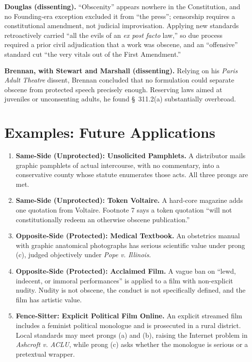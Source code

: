 \documentclass[12pt]{article}
\begin{document}
\textbf{Douglas (dissenting).} ``Obscenity'' appears nowhere in the Constitution, and no Founding-era exception excluded it from ``the press''; censorship requires a constitutional amendment, not judicial improvisation. Applying new standards retroactively carried ``all the evils of an \textit{ex post facto} law,'' so due process required a prior civil adjudication that a work was obscene, and an ``offensive'' standard cut ``the very vitals out of the First Amendment.''

\textbf{Brennan, with Stewart and Marshall (dissenting).} Relying on his \textit{Paris Adult Theatre} dissent, Brennan concluded that no formulation could separate obscene from protected speech precisely enough. Reserving laws aimed at juveniles or unconsenting adults, he found \S~311.2(a) substantially overbroad.

\section{Examples: Future Applications}

\begin{enumerate}
\item \textbf{Same-Side (Unprotected): Unsolicited Pamphlets.} A distributor mails graphic pamphlets of actual intercourse, with no commentary, into a conservative county whose statute enumerates those acts. All three prongs are met.
\item \textbf{Same-Side (Unprotected): Token Voltaire.} A hard-core magazine adds one quotation from Voltaire. Footnote 7 says a token quotation ``will not constitutionally redeem an otherwise obscene publication.''
\item \textbf{Opposite-Side (Protected): Medical Textbook.} An obstetrics manual with graphic anatomical photographs has serious scientific value under prong (c), judged objectively under \textit{Pope v. Illinois}.
\item \textbf{Opposite-Side (Protected): Acclaimed Film.} A vague ban on ``lewd, indecent, or immoral performances'' is applied to a film with non-explicit nudity. Nudity is not obscene, the conduct is not specifically defined, and the film has artistic value.
\item \textbf{Fence-Sitter: Explicit Political Film Online.} An explicit streamed film includes a feminist political monologue and is prosecuted in a rural district. Local standards may meet prongs (a) and (b), raising the Internet problem in \textit{Ashcroft v. ACLU}, while prong (c) asks whether the monologue is serious or a pretextual wrapper.
\end{enumerate}
\end{document}
